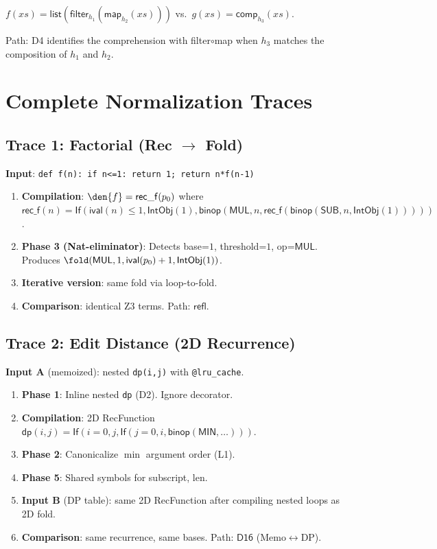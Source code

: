 \begin{example}
$f(xs) = \mathsf{list}(\mathsf{filter}_{h_1}(\mathsf{map}_{h_2}(xs)))$
vs.\ $g(xs) = \mathsf{comp}_{h_3}(xs)$.

Path: D4 identifies the comprehension with filter$\circ$map when
$h_3$ matches the composition of $h_1$ and $h_2$.
\end{example}


\chapter{Complete Normalization Traces}
\label{ch:traces}

\section{Trace 1: Factorial (Rec $\to$ Fold)}

\textbf{Input}: \texttt{def f(n): if n<=1: return 1; return n*f(n-1)}

\begin{enumerate}
  \item \textbf{Compilation}: $\den{f} = \mathsf{rec\_f}(p_0)$ where
    $\mathsf{rec\_f}(n) = \mathsf{If}(\mathsf{ival}(n) \leq 1,
    \mathsf{IntObj}(1), \mathsf{binop}(\mathsf{MUL}, n,
    \mathsf{rec\_f}(\mathsf{binop}(\mathsf{SUB}, n, \mathsf{IntObj}(1)))))$.
  \item \textbf{Phase 3 (Nat-eliminator)}: Detects base=$1$,
    threshold=$1$, op=$\mathsf{MUL}$.  Produces
    $\fold(\mathsf{MUL}, 1, \mathsf{ival}(p_0)+1, \mathsf{IntObj}(1))$.
  \item \textbf{Iterative version}: same fold via loop-to-fold.
  \item \textbf{Comparison}: identical Z3 terms.  Path: $\mathsf{refl}$.
\end{enumerate}

\section{Trace 2: Edit Distance (2D Recurrence)}

\textbf{Input A} (memoized): nested \texttt{dp(i,j)} with \texttt{@lru\_cache}.

\begin{enumerate}
  \item \textbf{Phase 1}: Inline nested \texttt{dp} (D2).  Ignore decorator.
  \item \textbf{Compilation}: 2D RecFunction $\mathsf{dp}(i,j) =
    \mathsf{If}(i=0, j, \mathsf{If}(j=0, i,
    \mathsf{binop}(\mathsf{MIN}, \ldots)))$.
  \item \textbf{Phase 2}: Canonicalize $\min$ argument order (L1).
  \item \textbf{Phase 5}: Shared symbols for subscript, len.
  \item \textbf{Input B} (DP table): same 2D RecFunction after
    compiling nested loops as 2D fold.
  \item \textbf{Comparison}: same recurrence, same bases.
    Path: $\mathsf{D16}$ (Memo$\leftrightarrow$DP).
\end{enumerate}

